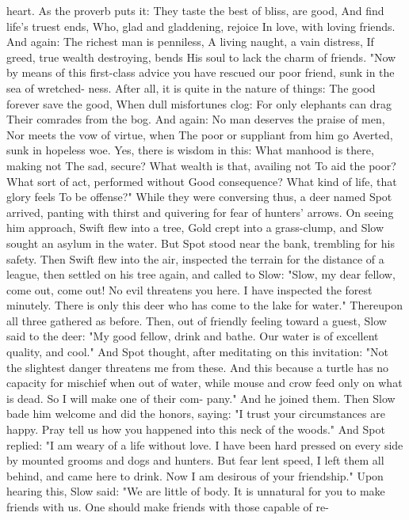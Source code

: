 \documentclass{book}
\begin{document}
heart. As the proverb puts it:
They taste the best of bliss, are good,
And find life's truest ends,
Who, glad and gladdening, rejoice
In love, with loving friends.
And again:
The richest man is penniless,
A living naught, a vain distress,
If greed, true wealth destroying, bends
His soul to lack the charm of friends.
"Now by means of this first-class advice you have
rescued our poor friend, sunk in the sea of wretched-
ness. After all, it is quite in the nature of things:
The good forever save the good,
When dull misfortunes clog:
For only elephants can drag
Their comrades from the bog.
And again:
No man deserves the praise of men,
Nor meets the vow of virtue, when
The poor or suppliant from him go
Averted, sunk in hopeless woe.
Yes, there is wisdom in this:
What manhood is there, making not
The sad, secure?
What wealth is that, availing not
To aid the poor?
What sort of act, performed without
Good consequence?
What kind of life, that glory feels
To be offense?"
While they were conversing thus, a deer named
Spot arrived, panting with thirst and quivering for
fear of hunters' arrows. On seeing him approach,
Swift flew into a tree, Gold crept into a grass-clump,
and Slow sought an asylum in the water. But Spot
stood near the bank, trembling for his safety.
Then Swift flew into the air, inspected the terrain
for the distance of a league, then settled on his tree
again, and called to Slow: "Slow, my dear fellow,
come out, come out! No evil threatens you here. I
have inspected the forest minutely. There is only this
deer who has come to the lake for water." Thereupon
all three gathered as before.
Then, out of friendly feeling toward a guest, Slow
said to the deer: "My good fellow, drink and bathe.
Our water is of excellent quality, and cool." And Spot
thought, after meditating on this invitation: "Not
the slightest danger threatens me from these. And
this because a turtle has no capacity for mischief
when out of water, while mouse and crow feed only
on what is dead. So I will make one of their com-
pany." And he joined them.
Then Slow bade him welcome and did the honors,
saying: "I trust your circumstances are happy. Pray
tell us how you happened into this neck of the
woods." And Spot replied: "I am weary of a life
without love. I have been hard pressed on every side
by mounted grooms and dogs and hunters. But fear
lent speed, I left them all behind, and came here to
drink. Now I am desirous of your friendship."
Upon hearing this, Slow said: "We are little of
body. It is unnatural for you to make friends with us.
One should make friends with those capable of re-
\end{document}
